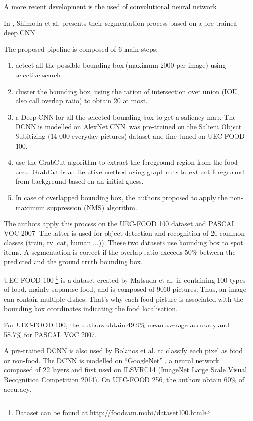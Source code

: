 
A more recent development is the used of convolutional neural network.

In \cite{Shimoda2015}, Shimoda et al. presents their segmentation process based on a pre-trained deep CNN.

The proposed pipeline is composed of 6 main steps:
\begin{enumerate}
    \item detect all the possible bounding box (maximum 2000 per image) using selective search
    \item cluster the bounding box, using the ration of intersection over union (IOU, also call overlap ratio) to obtain 20 at most.
    \item a Deep CNN for all the selected bounding box to get a saliency map. The DCNN is modelled on AlexNet CNN, was pre-trained on the Salient Object Subitizing (14 000 everyday pictures) dataset and fine-tuned on UEC FOOD 100.
    \item use the GrabCut algorithm to extract the foreground region from the food area. GrabCut is an iterative method using graph cuts to extract foreground from background based on an initial guess.
    \item In case of overlapped bounding box, the authors proposed to apply the non-maximum suppression (NMS) algorithm.
\end{enumerate}

The authors apply this process on the UEC-FOOD 100 dataset and PASCAL VOC 2007. The latter is used for object detection and recognition of 20 common classes (train, tv, cat, human ...)). These two datasets use bounding box to spot items. A segmentation is correct if the overlap ratio exceeds 50\% between the predicted and the ground truth bounding box.

UEC FOOD 100 \footnote{Dataset can be found at \url{http://foodcam.mobi/dataset100.html}} is a dataset created by Matsuda et al. in \cite{Matsuda2012a} containing 100 types of food, mainly Japanese food, and is composed of 9060 pictures. Thus, an image can contain multiple dishes. That's why each food picture is associated with the bounding box coordinates indicating the food localisation.

For UEC-FOOD 100, the authors obtain 49.9\% mean average accuracy and 58.7\% for PASCAL VOC 2007.

A pre-trained DCNN is also used by Bolanos et al. \cite{Bolanos2016} to classify each pixel as food or non-food. The DCNN is modelled on \enquote{GoogleNet} \cite{Szegedy2015}, a neural network composed of 22 layers and first used on ILSVRC14 (ImageNet Large Scale Visual Recognition Competition 2014). On UEC-FOOD 256, the authors obtain 60\% of accuracy.

